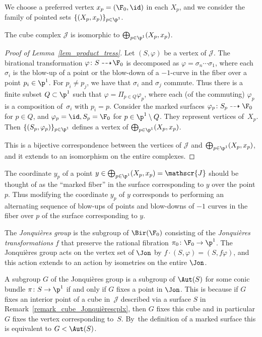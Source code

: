 We choose a preferred vertex
$x_p=(\F_0,\id)$ in each $X_p$, and we consider the family of pointed sets $\{(X_p,x_p)\}_{p\in \p^1}$.

\begin{lemma}\label{lem_product_tress}
The cube complex $\mathscr{J}$ is isomorphic to $\bigoplus_{p\in \p^1} (X_p,x_p)$.
\end{lemma}

\begin{proof}[Proof of Lemma~\ref{lem_product_tress}]
Let $(S,\varphi)$ be
a vertex of $\mathscr{J}$. The birational transformation $\varphi \colon S\dashrightarrow\! \F_0$ is decomposed as $\varphi=\sigma_n\cdots\sigma_1$, where each $\sigma_i$ is the blow-up of a point or the blow-down of a $-1$-curve in the fiber over a point $p_i\in \p^1$. For $p_i\neq p_j$,
we have that $\sigma_i$ and $\sigma_j$ commute. Thus there is a finite subset $Q\subset \p^1$ such that
$\varphi=\Pi_{p\in Q}\varphi_p$, where each (of the commuting) $\varphi_p$ is a composition of~$\sigma_i$ with $p_i=p$.
Consider the marked surfaces $\varphi_p\colon S_p \dashrightarrow\F_0$ for $p\in Q$, and $\varphi_p=\id, S_p=\F_0$ for $p\in \p^1\setminus Q$. They represent vertices of~$X_p$. Then $\{(S_p,\varphi_p)\}_{p\in \p^1}$
defines a vertex of $\bigoplus_{p\in \p^1} (X_p,x_p)$.

This is a bijective correspondence between the vertices of $\mathscr{J}$ and $\bigoplus_{p\in \p^1} (X_p,x_p)$, and it extends to an isomorphism on the entire complexes.
\end{proof}

The coordinate $y_p$ of a point $y\in \bigoplus_{p\in \p^1} (X_p,x_p)=\mathscr{J}$ should be thought of as the ``marked fiber''
in the surface corresponding to $y$ over the point $p$. Thus modifying the coordinate $y_p$ of $y$ corresponds to performing an alternating sequence of blow-ups of points and blow-downs of $-1$ curves in the fiber over $p$ of the surface corresponding to $y$.

\smallskip

The \emph{Jonquières group} is the subgroup of $\Bir(\F_0)$ consisting of the \emph{Jonquières transformations} $f$ that preserve the rational fibration $\pi_0\colon \F_0\to \p^1$. {The Jonquières group acts on the vertex set of $\Jon$ by $f\cdot(S, \varphi)=(S, f\varphi)$,
and this action extends to an action by isometries on the entire $\Jon$.}

\begin{remark}\label{rmk_subjonq_fixpoint}
A subgroup $G$ of the Jonquières group is a subgroup of $\Aut(S)$ for some
conic bundle $\pi \colon S\to \p^1$ if and only if $G$ fixes a point in $\Jon$. This is because if $G$ fixes an interior point of a cube in~$\mathscr{J}$ described via a surface $S$ in Remark~\ref{remark_cube_Jonquièrescplx}, then $G$ {fixes this cube and in particular $G$} fixes the vertex corresponding to~$S$. {By~the definition of a marked surface this is equivalent to} $G< \Aut(S)$.
\end{remark}

